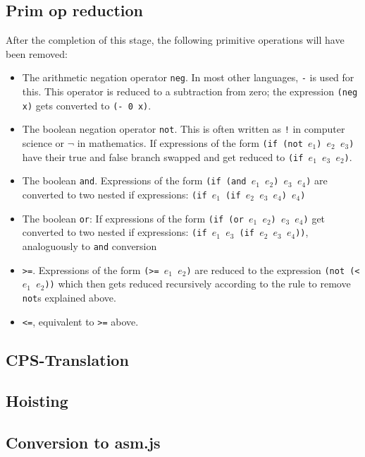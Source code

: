 \documentclass[11pt]{report}
\begin{document}
\subsection{Prim op reduction}
After the completion of this stage, the following primitive operations will have been removed: 
\begin{itemize}
\item The arithmetic negation operator \texttt{neg}. In most other languages, \texttt{-} is used for this. This operator is reduced to a subtraction from zero; the expression \texttt{(neg x)} gets converted to \texttt{(- 0 x)}.
\item The boolean negation operator \texttt{not}. This is often written as \texttt{!} in computer science or $\neg$ in mathematics. If expressions of the form \texttt{(if (not $e_1$) $e_2$ $e_3$)} have their true and false branch swapped and get reduced to \texttt{(if $e_1$ $e_3$ $e_2$)}.
\item The boolean \texttt{and}. Expressions of the form \texttt{(if (and $e_1$ $e_2$) $e_3$ $e_4$)} are converted to two nested if expressions: \texttt{(if $e_1$ (if $e_2$ $e_3$ $e_4$) $e_4$)}
\item The boolean \texttt{or}: If expressions of the form \texttt{(if (or $e_1$ $e_2$) $e_3$ $e_4$)} get converted to two nested if expressions: \texttt{(if $e_1$ $e_3$ (if $e_2$ $e_3$ $e_4$))}, analoguously to \texttt{and} conversion
\item \texttt{>=}. Expressions of the form \texttt{(>= $e_1$ $e_2$)} are reduced to the expression \texttt{(not (< $e_1$ $e_2$))} which then gets reduced recursively according to the rule to remove \texttt{not}s explained above.
\item \texttt{<=}, equivalent to \texttt{>=} above.
\end{itemize}

\subsection{CPS-Translation}

\subsection{Hoisting}
\subsection{Conversion to asm.js}
\end{document}
